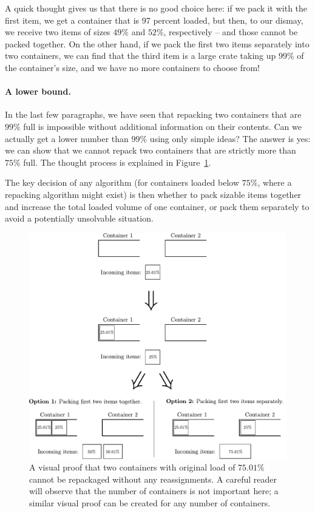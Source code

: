 A quick thought gives us that there is no good choice here: if we pack
it with the first item, we get a container that is 97 percent loaded,
but then, to our dismay, we receive two items of sizes $49\%$ and
$52\%$, respectively -- and those cannot be packed together. On the
other hand, if we pack the first two items separately into two
containers, we can find that the third item is a large crate taking up
$99\%$ of the container's size, and we have no more containers to
choose from!

\paragraph{A lower bound.} In the last few paragraphs, we have seen
that repacking two containers that are $99\%$ full is impossible
without additional information on their contents. Can we actually get
a lower number than $99\%$ using only simple ideas? The answer is yes:
we can show that we cannot repack two containers that are strictly
more than $75\%$ full. The thought process is explained in Figure~\ref{fig:example-lowerbound}.

The key decision of any algorithm (for containers loaded below $75\%$,
where a repacking algorithm might exist) is then whether to pack
sizable items together and increase the total loaded volume of one
container, or pack them separately to avoid a potentially unsolvable
situation.

\begin{figure}[th]
\begin{center}
\includegraphics[width=\textwidth]{img/example-lowerbound.pdf}
\end{center}
\caption{A visual proof that two containers with original load of $75.01\%$ cannot
be repackaged without any reassignments. A careful reader will observe that the number
of containers is not important here; a similar visual proof can be created for any
number of containers.}
\label{fig:example-lowerbound}
\end{figure}


